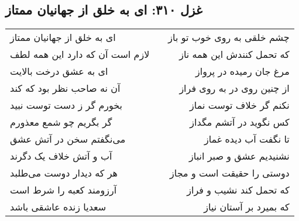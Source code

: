 \begin{center}
\section*{غزل ۳۱۰: ای به خلق از جهانیان ممتاز}
\label{sec:310}
\begin{longtable}{l p{0.5cm} r}
ای به خلق از جهانیان ممتاز
&&
چشم خلقی به روی خوب تو باز
\\
لازم است آن که دارد این همه لطف
&&
که تحمل کنندش این همه ناز
\\
ای به عشق درخت بالایت
&&
مرغ جان رمیده در پرواز
\\
آن نه صاحب نظر بود که کند
&&
از چنین روی در به روی فراز
\\
بخورم گر ز دست توست نبید
&&
نکنم گر خلاف توست نماز
\\
گر بگریم چو شمع معذورم
&&
کس نگوید در آتشم مگداز
\\
می‌نگفتم سخن در آتش عشق
&&
تا نگفت آب دیده غماز
\\
آب و آتش خلاف یک دگرند
&&
نشنیدیم عشق و صبر انباز
\\
هر که دیدار دوست می‌طلبد
&&
دوستی را حقیقت است و مجاز
\\
آرزومند کعبه را شرط است
&&
که تحمل کند نشیب و فراز
\\
سعدیا زنده عاشقی باشد
&&
که بمیرد بر آستان نیاز
\\
\end{longtable}
\end{center}
